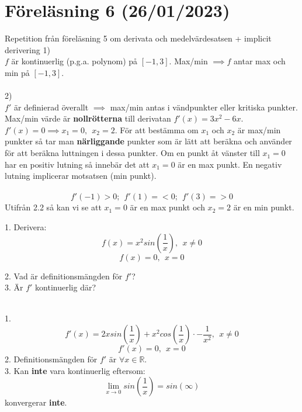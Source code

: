 \documentclass{report}
\begin{document}
\section{Föreläsning 6 (26/01/2023)}
Repetition från föreläsning 5 om derivata och medelvärdesatsen + implicit derivering
{
1)\\
$ f $ är kontinuerlig (p.g.a. polynom) på $ [-1,3] $. Max/min $ \implies f $ antar max och min på $ [-1,3] $.\\\\

2)\\
$ f' $ är definierad överallt $ \implies  $ max/min antas i vändpunkter eller kritiska punkter. Max/min värde är \textbf{nollrötterna} till derivatan $ f'(x) = 3x^2-6x $. $ f'(x) = 0 \implies x_1 = 0,\:\: x_2 = 2 $. För att bestämma om $ x_1 $ och $ x_2 $ är max/min punkter så tar man \textbf{närliggande} punkter som är lätt att beräkna och använder för att beräkna luttningen i dessa punkter. Om en punkt åt vänster till $ x_1 = 0 $ har en positiv lutning så innebär det att $ x_1=0 $ är en max punkt. En negativ lutning implicerar motsatsen (min punkt).\\\\
\begin{equation}
f'(-1) > 0;\:\:f'(1) = < 0;\:\:f'(3) = > 0
\end{equation}
Utifrån 2.2 så kan vi se att $ x_1 = 0 $ är en max punkt och $ x_2 = 2 $ är en min punkt.  
}

\vspace{20pt}
\qs{}
{
1. Derivera:
\begin{equation*}
f(x) = x^2 sin( \frac{1}{x} ),\:\:x \ne 0
\end{equation*}
\begin{equation*}
f(x) = 0,\:\:x = 0
\end{equation*}

2. Vad är definitionsmängden för $ f' $?\\
3. Är $ f' $ kontinuerlig där?
}

\sol\\
1.
\begin{equation*}
f'(x) = 2xsin( \frac{1}{x} ) + x^2cos( \frac{1}{x} ) \cdot -\frac{1}{x^2},\:\:x \ne 0
\end{equation*}
\begin{equation*}
f'(x) = 0,\:\:x = 0
\end{equation*}
2. Definitionsmängden för $ f' $ är $ \forall x \in \mathbb{R}$.\\
3. Kan \textbf{inte} vara kontinuerlig eftersom:
\begin{equation*}
\lim_{x \to 0} sin( \frac{1}{x} ) = sin( \infty)
\end{equation*}
konvergerar \textbf{inte}. 
\end{document}
